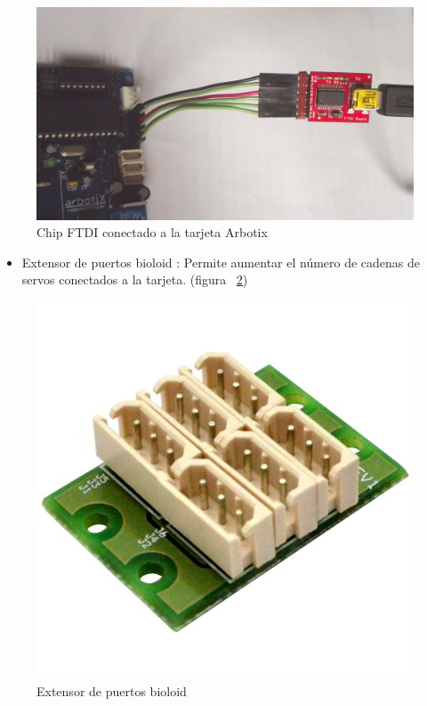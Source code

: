 \begin{figure}[hbtp]
\centering
\label{fig:ftdi}
\includegraphics[scale=0.09]{imagenes/DSCF1162.jpg}
\caption{Chip FTDI conectado a la tarjeta Arbotix}
\end{figure}

\begin{itemize}
\item Extensor de puertos bioloid : Permite aumentar el número de cadenas de servos conectados a la tarjeta. (figura ~\ref{fig:ext}) \cite{hub} 
\end{itemize}

\begin{figure}[hbtp]
\centering
\label{fig:ext}
\includegraphics[scale=0.3]{imagenes/Dynamixel-AX-MX-6-Port-Extension-Hub-600x600.jpg}
\caption{Extensor de puertos bioloid}
\end{figure}

